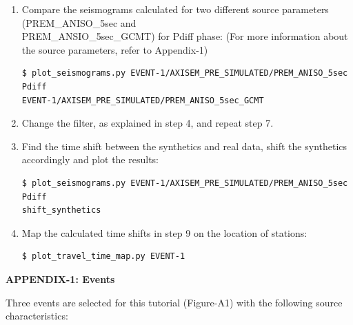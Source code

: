 \documentclass{article}
\begin{document}
\begin{enumerate}
\item Compare the seismograms calculated for two different source parameters (PREM\_ANISO\_5sec and \\
PREM\_ANSIO\_5sec\_GCMT) for Pdiff phase: (For more information about the source 
parameters, refer to Appendix-1)

\begin{verbatim}
$ plot_seismograms.py EVENT-1/AXISEM_PRE_SIMULATED/PREM_ANISO_5sec Pdiff 
EVENT-1/AXISEM_PRE_SIMULATED/PREM_ANISO_5sec_GCMT
\end{verbatim}

\item Change the filter, as explained in step 4, and repeat step 7.

\item Find the time shift between the synthetics and real data, shift the synthetics 
accordingly and plot the results:

\begin{verbatim}
$ plot_seismograms.py EVENT-1/AXISEM_PRE_SIMULATED/PREM_ANISO_5sec Pdiff 
shift_synthetics
\end{verbatim}

\item Map the calculated time shifts in step 9 on the location of stations:

\begin{verbatim}
$ plot_travel_time_map.py EVENT-1
\end{verbatim}

\end{enumerate}

\newpage
{\large{}\textbf{APPENDIX-1: Events}}

Three events are selected for this tutorial (Figure-A1) with the following source 
characteristics:
\end{document}
